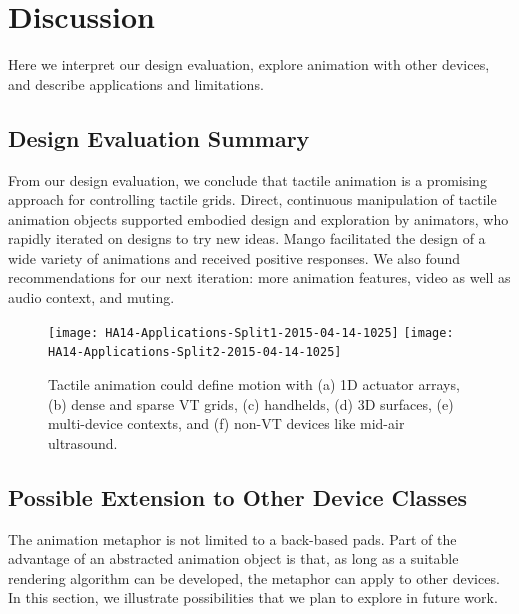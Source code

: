 \section{Discussion}
Here we interpret our design evaluation, explore animation with other devices, and describe applications and limitations.

\subsection{Design Evaluation Summary}
From our design evaluation, we conclude that tactile animation is a promising approach for controlling tactile grids.
Direct, continuous manipulation of tactile animation objects supported embodied design and exploration by animators, who rapidly iterated on designs to try new ideas.
Mango facilitated the design of a wide variety of animations and received positive responses.
We also found recommendations for our next iteration: more animation features, video as well as audio context, and muting.%

\begin{figure}[htb] %
   \centering
   \texttt{[image: HA14-Applications-Split1-2015-04-14-1025]} 
\qquad
   \texttt{[image: HA14-Applications-Split2-2015-04-14-1025]} 
      \caption{Tactile animation could define motion with (a) 1D actuator arrays, (b) dense and sparse VT grids, (c) handhelds, (d)  3D surfaces, (e) multi-device contexts, and  (f) non-VT devices like mid-air ultrasound.}
   \label{fig:application:space}
\end{figure}

\subsection{Possible Extension to Other Device Classes}
The animation metaphor is not limited to a back-based pads.
Part of the advantage of an abstracted animation object is that, 
as long as a suitable rendering algorithm can be developed, the metaphor can apply to other devices.
In this section, we illustrate possibilities that we plan to explore in future work.


